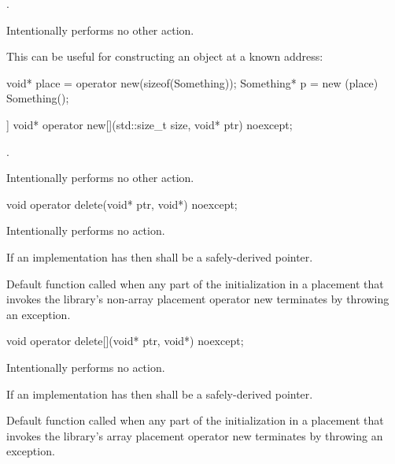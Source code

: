 \begin{itemdescr}
\pnum
\returns
{}.

\pnum
\remarks
Intentionally performs no other action.

\pnum
\begin{example}
This can be useful for constructing an object at a known address:

\begin{codeblock}
void* place = operator new(sizeof(Something));
Something* p = new (place) Something();
\end{codeblock}
\end{example}
\end{itemdescr}

%
\begin{itemdecl}
[[nodiscard]] void* operator new[](std::size_t size, void* ptr) noexcept;
\end{itemdecl}

\begin{itemdescr}
\pnum
\returns
{}.

\pnum
\remarks
Intentionally performs no other action.
\end{itemdescr}

%
\begin{itemdecl}
void operator delete(void* ptr, void*) noexcept;
\end{itemdecl}

\begin{itemdescr}
\pnum
\effects
Intentionally performs no action.

\pnum
\requires
If an implementation has 
then  shall be a safely-derived pointer.

\pnum
\remarks
Default function called when any part of the initialization in a
placement  that invokes the library's
non-array placement operator new
terminates by throwing an exception.
\end{itemdescr}

%
\begin{itemdecl}
void operator delete[](void* ptr, void*) noexcept;
\end{itemdecl}

\begin{itemdescr}
\pnum
\effects
Intentionally performs no action.

\pnum
\requires
If an implementation has 
then  shall be a safely-derived pointer.

\pnum
\remarks
Default function called when any part of the initialization in a
placement  that invokes the library's
array placement operator new
terminates by throwing an exception.
\end{itemdescr}


